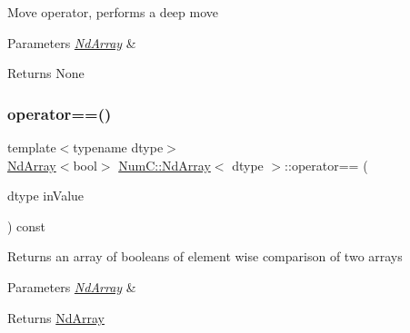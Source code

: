 Move operator, performs a deep move


\begin{DoxyParams}{Parameters}
{\em \mbox{\hyperlink{class_num_c_1_1_nd_array}{Nd\+Array}}} & \\
\hline
\end{DoxyParams}
\begin{DoxyReturn}{Returns}
None 
\end{DoxyReturn}
\mbox{\label{class_num_c_1_1_nd_array_aba7821dd819fd42024c36706816dd4a6}} 
\subsubsection{\texorpdfstring{operator==()}{operator==()}\hspace{0.1cm}{\footnotesize\ttfamily [1/2]}}
{\footnotesize\ttfamily template$<$typename dtype$>$ \\
\mbox{\hyperlink{class_num_c_1_1_nd_array}{Nd\+Array}}$<$bool$>$ \mbox{\hyperlink{class_num_c_1_1_nd_array}{Num\+C\+::\+Nd\+Array}}$<$ dtype $>$\+::operator== (\begin{DoxyParamCaption}\item[{dtype}]{in\+Value }\end{DoxyParamCaption}) const\hspace{0.3cm}{\ttfamily [inline]}}

Returns an array of booleans of element wise comparison of two arrays


\begin{DoxyParams}{Parameters}
{\em \mbox{\hyperlink{class_num_c_1_1_nd_array}{Nd\+Array}}} & \\
\hline
\end{DoxyParams}
\begin{DoxyReturn}{Returns}
\mbox{\hyperlink{class_num_c_1_1_nd_array}{Nd\+Array}} 
\end{DoxyReturn}
\mbox{\label{class_num_c_1_1_nd_array_a3abe0b9a995e04444d124a4d3b4b332e}} 

